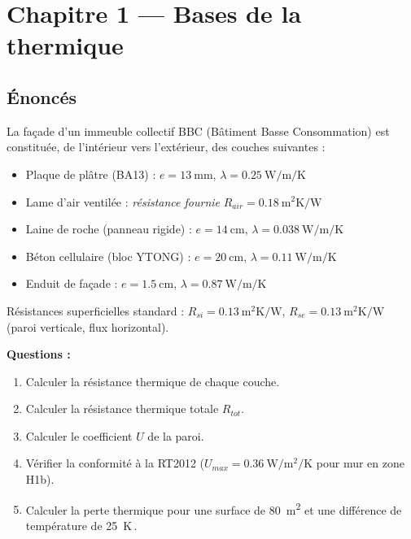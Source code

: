 \chapter*{Chapitre 1 — Bases de la thermique}

\section*{Énoncés}


La façade d'un immeuble collectif BBC (Bâtiment Basse Consommation) est constituée,
de l'intérieur vers l'extérieur, des couches suivantes :
\begin{itemize}
  \item Plaque de plâtre (BA13) : \(e = \SI{13}{\milli\meter}\), \(\lambda = \SI{0,25}{\watt\per\meter\per\kelvin}\)
  \item Lame d'air ventilée : \textit{résistance fournie} \(R_{air} = \SI{0,18}{\meter\squared\kelvin\per\watt}\)
  \item Laine de roche (panneau rigide) : \(e = \SI{14}{\centi\meter}\), \(\lambda = \SI{0,038}{\watt\per\meter\per\kelvin}\)
  \item Béton cellulaire (bloc YTONG) : \(e = \SI{20}{\centi\meter}\), \(\lambda = \SI{0,11}{\watt\per\meter\per\kelvin}\)
  \item Enduit de façade : \(e = \SI{1,5}{\centi\meter}\), \(\lambda = \SI{0,87}{\watt\per\meter\per\kelvin}\)
\end{itemize}

Résistances superficielles standard : \(R_{si} = \SI{0,13}{\meter\squared\kelvin\per\watt}\),
\(R_{se} = \SI{0,13}{\meter\squared\kelvin\per\watt}\) (paroi verticale, flux horizontal).

\textbf{Questions :}
\begin{enumerate}
  \item Calculer la résistance thermique de chaque couche.
  \item Calculer la résistance thermique totale \(R_{tot}\).
  \item Calculer le coefficient \(U\) de la paroi.
  \item Vérifier la conformité à la RT2012 (\(U_{max} = \SI{0,36}{\watt\per\meter\squared\per\kelvin}\) pour mur en zone H1b).
  \item Calculer la perte thermique pour une surface de \SI{80}{\meter\squared} et une
        différence de température de \SI{25}{\kelvin}\,.
\end{enumerate}

